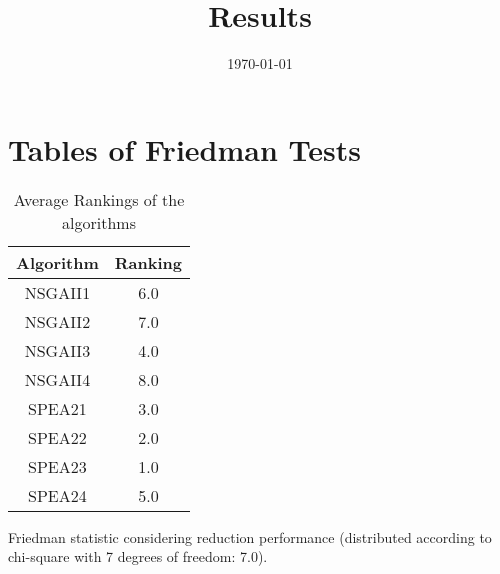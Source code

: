 \documentclass{article}
\title{Results}
\author{}
\date{\today}
\begin{document}
\oddsidemargin 0in \topmargin 0in\maketitle
\section{Tables of Friedman Tests}
\begin{table}[!htp]
\centering
\caption{Average Rankings of the algorithms
}\begin{tabular}{c|c}
Algorithm&Ranking\\
\hline
NSGAII1&6.0\\
NSGAII2&7.0\\
NSGAII3&4.0\\
NSGAII4&8.0\\
SPEA21&3.0\\
SPEA22&2.0\\
SPEA23&1.0\\
SPEA24&5.0\\
\end{tabular}
\end{table}


Friedman statistic considering reduction performance (distributed according to chi-square with 7 degrees of freedom: 7.0).
\end{document}
